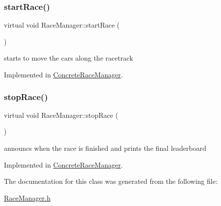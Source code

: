 \subsubsection{\texorpdfstring{start\+Race()}{startRace()}}
{\footnotesize\ttfamily virtual void Race\+Manager\+::start\+Race (\begin{DoxyParamCaption}{ }\end{DoxyParamCaption})\hspace{0.3cm}{\ttfamily [pure virtual]}}

starts to move the cars along the racetrack 

Implemented in \mbox{\hyperlink{class_concrete_race_manager_af9266e7de2aec27b970878b8a68e6276}{Concrete\+Race\+Manager}}.

\mbox{\label{class_race_manager_a008bf389eeb0dc37dceb5f5fd0bcf9c1}} 
\subsubsection{\texorpdfstring{stop\+Race()}{stopRace()}}
{\footnotesize\ttfamily virtual void Race\+Manager\+::stop\+Race (\begin{DoxyParamCaption}{ }\end{DoxyParamCaption})\hspace{0.3cm}{\ttfamily [pure virtual]}}

announcs when the race is finished and prints the final leaderboard 

Implemented in \mbox{\hyperlink{class_concrete_race_manager_ac55ae9738d8cf5ce6bd1fe2f9356c6f7}{Concrete\+Race\+Manager}}.



The documentation for this class was generated from the following file\+:\begin{DoxyCompactItemize}
\item 
\mbox{\hyperlink{_race_manager_8h}{Race\+Manager.\+h}}\end{DoxyCompactItemize}
